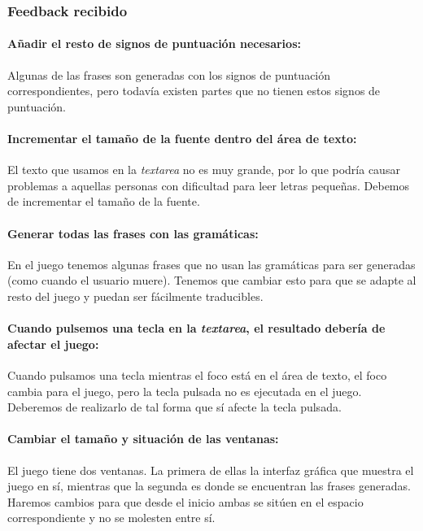 \subsubsection{Feedback recibido}

\paragraph{Añadir el resto de signos de puntuación necesarios:} Algunas de las frases son generadas con los signos de puntuación correspondientes, pero todavía existen partes que no tienen estos signos de puntuación.

\paragraph{Incrementar el tamaño de la fuente dentro del área de texto:} El texto que usamos en la \textit{textarea} no es muy grande, por lo que podría causar problemas a aquellas personas con dificultad para leer letras pequeñas. Debemos de incrementar el tamaño de la fuente.

\paragraph{Generar todas las frases con las gramáticas:} En el juego tenemos algunas frases que no usan las gramáticas para ser generadas (como cuando el usuario muere). Tenemos que cambiar esto para que se adapte al resto del juego y puedan ser fácilmente traducibles.

\paragraph{Cuando pulsemos una tecla en la \textit{textarea}, el resultado debería de afectar el juego:} Cuando pulsamos una tecla mientras el foco está en el área de texto, el foco cambia para el juego, pero la tecla pulsada no es ejecutada en el juego. Deberemos de realizarlo de tal forma que sí afecte la tecla pulsada.

\paragraph{Cambiar el tamaño y situación de las ventanas:} El juego tiene dos ventanas. La primera de ellas la interfaz gráfica que muestra el juego en sí, mientras que la segunda es donde se encuentran las frases generadas. Haremos cambios para que desde el inicio ambas se sitúen en el espacio correspondiente y no se molesten entre sí.

